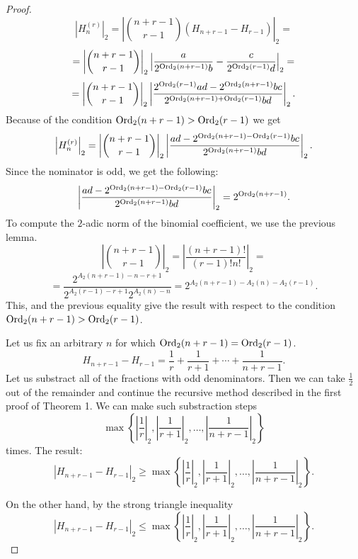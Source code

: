 \documentclass[a4paper,12pt]{amsart}
\begin{document}
\begin{proof}
\[\left|H_n^{(r)}\right|_2=\left|\binom{n+r-1}{r-1}(H_{n+r-1}-H_{r-1})\right|_2=\]
\[=\left|\binom{n+r-1}{r-1}\right|_2\left|\frac{a}{2^{{\mathop{\textup{Ord}}\nolimits}_2(n+r-1)}b}-\frac{c}{2^{{\mathop{\textup{Ord}}\nolimits}_2(r-1)}d}\right|_2=\]
\[=\left|\binom{n+r-1}{r-1}\right|_2\left|\frac{2^{{\mathop{\textup{Ord}}\nolimits}_2(r-1)}ad-2^{{\mathop{\textup{Ord}}\nolimits}_2(n+r-1)}bc}{2^{{\mathop{\textup{Ord}}\nolimits}_2(n+r-1)+{\mathop{\textup{Ord}}\nolimits}_2(r-1)}bd}\right|_2.\]
Because of the condition ${\mathop{\textup{Ord}}\nolimits}_2(n+r-1)>{\mathop{\textup{Ord}}\nolimits}_2(r-1)$ we get
\[\left|H_n^{(r)}\right|_2=\left|\binom{n+r-1}{r-1}\right|_2\left|\frac{ad-2^{{\mathop{\textup{Ord}}\nolimits}_2(n+r-1)-{\mathop{\textup{Ord}}\nolimits}_2(r-1)}bc}{2^{{\mathop{\textup{Ord}}\nolimits}_2(n+r-1)}bd}\right|_2.\]
Since the nominator is odd, we get the following:
\[\left|\frac{ad-2^{{\mathop{\textup{Ord}}\nolimits}_2(n+r-1)-{\mathop{\textup{Ord}}\nolimits}_2(r-1)}bc}{2^{{\mathop{\textup{Ord}}\nolimits}_2(n+r-1)}bd}\right|_2=2^{{\mathop{\textup{Ord}}\nolimits}_2(n+r-1)}.\]
To compute the $2$-adic norm of the binomial coefficient, we use the previous lemma.
\[\left|\binom{n+r-1}{r-1}\right|_2=\left|\frac{(n+r-1)!}{(r-1)!n!}\right|_2=\]
\[=\frac{2^{A_2(n+r-1)-n-r+1}}{2^{A_2(r-1)-r+1}2^{A_2(n)-n}}=2^{A_2(n+r-1)-A_2(n)-A_2(r-1)}.\]
This, and the previous equality give the result with respect to the condition ${\mathop{\textup{Ord}}\nolimits}_2(n+r-1)>{\mathop{\textup{Ord}}\nolimits}_2(r-1)$.

Let us fix an arbitrary $n$ for which ${\mathop{\textup{Ord}}\nolimits}_2(n+r-1)={\mathop{\textup{Ord}}\nolimits}_2(r-1)$.
\[H_{n+r-1}-H_{r-1}=\frac{1}{r}+\frac{1}{r+1}+\cdots+\frac{1}{n+r-1}.\]
Let us substract all of the fractions with odd denominators. Then we can take $\frac{1}{2}$ out of the remainder and continue the recursive method described in the first proof of Theorem 1. We can make such substraction steps
\[\max\left\{\left|\frac{1}{r}\right|_2,\left|\frac{1}{r+1}\right|_2,\dots,\left|\frac{1}{n+r-1}\right|_2\right\}\]
times. The result:
\[|H_{n+r-1}-H_{r-1}|_2\ge\max\left\{\left|\frac{1}{r}\right|_2,\left|\frac{1}{r+1}\right|_2,\dots,\left|\frac{1}{n+r-1}\right|_2\right\}.\]

On the other hand, by the strong triangle inequality
\[|H_{n+r-1}-H_{r-1}|_2\le\max\left\{\left|\frac{1}{r}\right|_2,\left|\frac{1}{r+1}\right|_2,\dots,\left|\frac{1}{n+r-1}\right|_2\right\}.\]
\end{proof}
\end{document}
